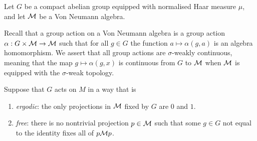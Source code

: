 Let $G$ be a compact abelian group equipped with normalised Haar
measure $\mu$, and let $\mathcal{M}$ be a Von Neumann algebra.

Recall that a group action on a Von Neumann algebra
is a group action $\alpha:G\times \mathcal{M}\rightarrow \mathcal{M}$ such that
for all $g \in G$ the function $a\mapsto \alpha(g,a)$ is an algebra
homomorphism. We assert that all group actions
are $\sigma$-weakly continuous, meaning that the map $g\mapsto \alpha(g,x)$
is continuous from $G$ to $\mathcal{M}$ when $\mathcal{M}$ is equipped with the $\sigma$-weak
topology.

Suppose that $G$ acts on $M$ in a way that is
\begin{enumerate}
    \item{} \emph{ergodic}: the only projections in $\mathcal{M}$
    fixed by $G$ are $0$ and $1$.
    \item{} \emph{free}: there is no nontrivial projection $p \in \mathcal{M}$
    such that some $g \in G$ not equal to the identity fixes all of $p\mathcal{M} p$.
\end{enumerate}

